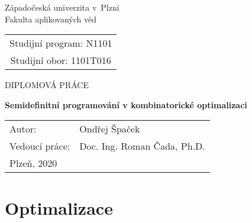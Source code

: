 \documentclass[a4paper,oneside,12pt]{book}
\theoremstyle{definition}
\theoremstyle{plain}
\theoremstyle{remark}
\begin{document}
\thispagestyle{empty}
\begin{center}
  {\Huge
  Západočeská univerzita v~Plzni\\[3pt]
  Fakulta aplikovaných věd
  }

	\vspace{10mm}

  {\Large
  \begin{tabular}{c}
		Studijní program: N1101 \\[3pt]
		Studijní obor: 1101T016 \\
  \end{tabular}
  }

  \vspace{40mm}

  {\huge \MakeUppercase{Diplomová práce}}\\[3pt]
  {\Large \textbf{Semidefinitní programování v kombinatorické optimalizaci}\par}
\end{center}

\vfill

{\large
  \begin{tabular}{ll}
    Autor: & Ondřej Špaček\\
    Vedoucí práce: & Doc. Ing. Roman Čada, Ph.D.\\[30pt]
    Plzeň, 2020 &
  \end{tabular}
}
\clearpage{\pagestyle{empty}}


\tableofcontents
\setcounter{page}{1}
\pagebreak

{
  \pagestyle{plain}
  
  \clearpage
}


\part{Optimalizace}


\clearpage


\clearpage


\clearpage


\clearpage
\end{document}
